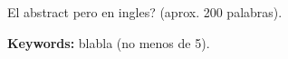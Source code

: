 \chapter*{\runtitle}

\noindent El abstract pero en ingles? (aprox. 200 palabras).

\bigskip

\noindent\textbf{Keywords:} blabla (no menos de 5).